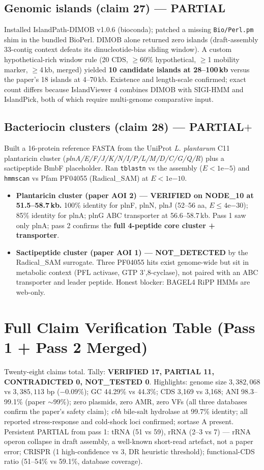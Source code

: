 \documentclass[11pt]{article}
\begin{document}
\subsection{Genomic islands (claim 27) --- PARTIAL}
Installed IslandPath-DIMOB v1.0.6 (bioconda); patched a missing \texttt{Bio/Perl.pm} shim in the bundled BioPerl. DIMOB alone returned zero islands (draft-assembly 33-contig context defeats its dinucleotide-bias sliding window). A custom hypothetical-rich window rule (20 CDS, $\ge$60\% hypothetical, $\ge$1 mobility marker, $\ge$4\,kb, merged) yielded \textbf{10 candidate islands at 28--100\,kb} versus the paper's 18 islands at 4--70\,kb. Existence and length-scale confirmed; exact count differs because IslandViewer 4 combines DIMOB with SIGI-HMM and IslandPick, both of which require multi-genome comparative input.

\subsection{Bacteriocin clusters (claim 28) --- PARTIAL$+$}
Built a 16-protein reference FASTA from the UniProt \emph{L. plantarum} C11 plantaricin cluster (\emph{plnA/E/F/J/K/N/I/P/L/M/D/C/G/Q/R}) plus a sactipeptide BmbF placeholder. Ran \texttt{tblastn} vs the assembly ($E<1\mathrm{e}{-5}$) and \texttt{hmmscan} vs Pfam PF04055 (Radical\_SAM) at $E<1\mathrm{e}{-10}$.
\begin{itemize}
  \item \textbf{Plantaricin cluster (paper AOI 2) --- VERIFIED on NODE\_10 at 51.5--58.7\,kb.} 100\% identity for plnF, plnN, plnJ (52--56 aa, $E \le 4\mathrm{e}{-30}$); 85\% identity for plnA; plnG ABC transporter at 56.6--58.7\,kb. Pass 1 saw only plnA; pass 2 confirms the \textbf{full 4-peptide core cluster + transporter}.
  \item \textbf{Sactipeptide cluster (paper AOI 1) --- NOT\_DETECTED} by the Radical\_SAM surrogate. Three PF04055 hits exist genome-wide but sit in metabolic context (PFL activase, GTP 3',8-cyclase), not paired with an ABC transporter and leader peptide. Honest blocker: BAGEL4 RiPP HMMs are web-only.
\end{itemize}

\section{Full Claim Verification Table (Pass 1 + Pass 2 Merged)}
Twenty-eight claims total. Tally: \textbf{VERIFIED 17, PARTIAL 11, CONTRADICTED 0, NOT\_TESTED 0}. Highlights: genome size $3{,}382{,}068$ vs $3{,}385{,}113$ bp ($-0.09\%$); GC 44.29\% vs 44.3\%; CDS 3{,}169 vs 3{,}168; ANI 98.3--99.1\% (paper $\sim$99\%); zero plasmids, zero AMR, zero VFs (all three databases confirm the paper's safety claim); \emph{cbh} bile-salt hydrolase at 99.7\% identity; all reported stress-response and cold-shock loci confirmed; sortase A present. Persistent PARTIAL from pass 1: tRNA (51 vs 59), rRNA (2--3 vs 7) --- rRNA operon collapse in draft assembly, a well-known short-read artefact, not a paper error; CRISPR (1 high-confidence vs 3, DR heuristic threshold); functional-CDS ratio (51--54\% vs 59.1\%, database coverage).
\end{document}

